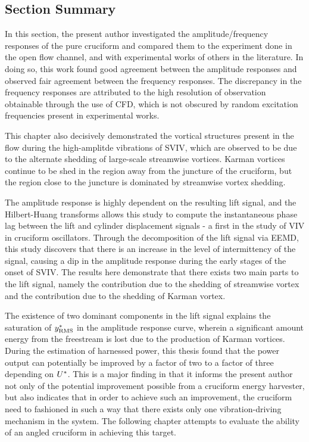 \documentclass[oneside]{utmthesis}
\begin{document}
\subsection{Section Summary} \label{sec:secSumPure}
In this section, the present author investigated the amplitude/frequency responses of the pure cruciform and compared them to the experiment done in the open flow channel, and with experimental works of others in the literature. In doing so, this work found good agreement between the amplitude responses and observed fair agreement between the frequency responses. The discrepancy in the frequency responses are attributed to the high resolution of observation obtainable through the use of CFD, which is not obscured by random excitation frequencies present in experimental works.

This chapter also decisively demonstrated the vortical structures present in the flow during the high-amplitde vibrations of SVIV, which are observed to be due to the alternate shedding of large-scale streamwise vortices. Karman vortices continue to be shed in the region away from the juncture of the cruciform, but the region close to the juncture is dominated by streamwise vortex shedding.

The amplitude response is highly dependent on the resulting lift signal, and the Hilbert-Huang transforms allows this study to compute the instantaneous phase lag between the lift and cylinder displacement signals - a first in the study of VIV in cruciform oscillators. Through the decomposition of the lift signal via EEMD, this study discovers that there is an increase in the level of intermittency of the signal, causing a dip in the amplitude response during the early stages of the onset of SVIV. The results here demonstrate that there exists two main parts to the lift signal, namely the contribution due to the shedding of streamwise vortex and the contribution due to the shedding of Karman vortex.

The existence of two dominant components in the lift signal explains the saturation of $y^{*}_{\text{RMS}}$ in the amplitude response curve, wherein a significant amount energy from the freestream is lost due to the production of Karman vortices. During the estimation of harnessed power, this thesis found that the power output can potentially be improved by a factor of two to a factor of three depending on $U^{*}$. This is a major finding in that it informs the present author not only of the potential improvement possible from a cruciform energy harvester, but also indicates that in order to achieve such an improvement, the cruciform need to fashioned in such a way that there exists only one vibration-driving mechanism in the system. The following chapter attempts to evaluate the ability of an angled cruciform in achieving this target.
\end{document}
